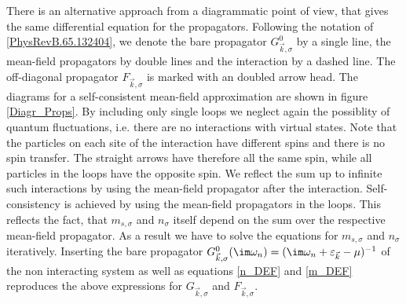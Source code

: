\documentclass[a4paper,10pt]{report}
\begin{document}

There is an alternative approach from a diagrammatic point of view, that gives the same differential equation for the propagators.
Following the notation of \ref{PhysRevB.65.132404}, 
we denote the bare propagator $G^0_{\vec k,\sigma}$ by a single line, the mean-field propagators by double lines and the interaction by a dashed line.
The off-diagonal propagator $F_{\vec k ,\sigma}$ is marked with an doubled arrow head.
The diagrams for a self-consistent mean-field approximation are shown in figure \ref{Diagr_Props}. 
%
By including only single loops we neglect again the possiblity of quantum fluctuations, i.e. there are no interactions with virtual states.
Note that the particles on each site of the interaction have different spins and there is no spin transfer. 
The straight arrows have therefore all the same spin, while all particles in the loops have the opposite spin.
We reflect the sum up to infinite such interactions by using the mean-field propagator after the interaction. 
%
Self-consistency is achieved by using the mean-field propagators in the loops.
This reflects the fact, that $m_{s,\sigma}$ and $n_{\sigma}$ itself depend on the sum over the respective mean-field propagator.
As a result we have to solve the equations for $m_{s,\sigma}$ and $n_{\sigma}$ iteratively. %
%
Inserting the bare propagator ${G^0_{\vec k,\sigma}(\im \omega_n)}=(\im \omega_n +\varepsilon_{\vec k} - \mu)^{-1}$ of the non interacting system
as well as equations \ref{n_DEF} and \ref{m_DEF}
reproduces the above expressions for $G_{\vec k, \sigma}$ and $F_{\vec k ,\sigma}$.
\end{document}
